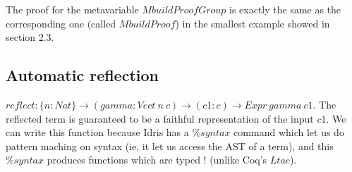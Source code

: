 The proof for the metavariable $MbuildProofGroup$ is exactly the same as the corresponding one (called $MbuildProof$) in the smallest example showed in section 2.3.


\subsection {Automatic reflection}
$reflect : \{n:Nat\} \rightarrow (gamma : Vect\ n\ c) \rightarrow (c1:c) \rightarrow Expr\ gamma\ c1$.
The reflected term is guaranteed to be a faithful representation of the input $c1$. We can write this function because Idris has a $\%syntax$ command which let us do pattern maching on syntax (ie, it let us access the AST of a term), and this $\%syntax$ produces functions which are typed ! (unlike Coq's $Ltac$). 









